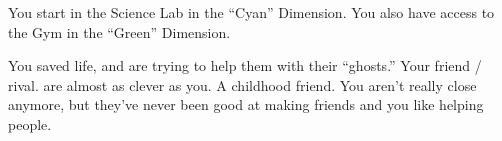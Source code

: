 \documentclass[char]{TMFHope}
\begin{document}
\begin{itemz}[Notes]
	\item You start in the Science Lab in the ``Cyan'' Dimension. You also have access to the Gym in the ``Green'' Dimension. 
\end{itemz}

\begin{contacts}
	\contact{\cCap{}} You saved \cCap{\their} life, and are trying to help them with their ``ghosts.''
	\contact{\cSci{}} Your friend / rival. \cSci{\They} are almost as clever as you.
	\contact{\cCDip{}} A childhood friend. You aren't really close anymore, but they've never been good at making friends and you like helping people.
\end{contacts}
\end{document}
